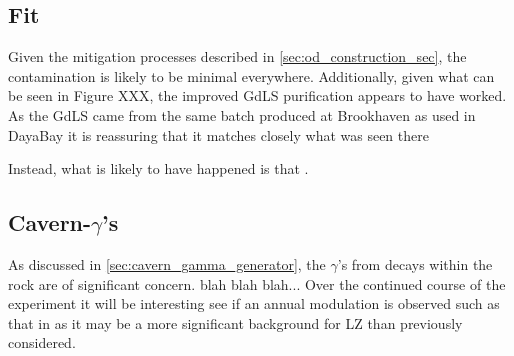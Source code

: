 


\subsection{Fit}
\par
Given the mitigation processes described in \autoref{sec:od_construction_sec}, the contamination is likely to be minimal everywhere. 
Additionally, given what can be seen in Figure XXX, the improved GdLS purification appears to have worked.
As the GdLS came from the same batch produced at Brookhaven as used in DayaBay it is reassuring that it matches closely what was seen there

\par
Instead, what is likely to have happened is that \cite{KamLAND_LS_contaminants_ref}.


\subsection{Cavern-$\gamma$'s}
\par
As discussed in \autoref{sec:cavern_gamma_generator}, the $\gamma$'s from decays within the rock are of significant concern.
blah blah blah...
Over the continued course of the experiment it will be interesting see if an annual modulation is observed such as that in \cite{cavern_gamma_annual_modulation_CoGeNT_ref, cavern_gammas_in_Soudan_mine_ref} as it may be a more significant background for LZ than previously considered.